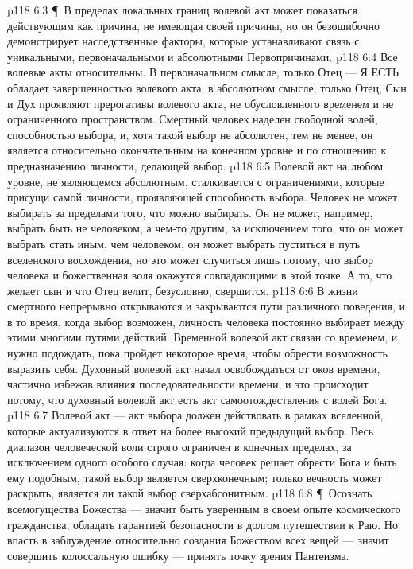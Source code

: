 \vs p118 6:3 \P\ В пределах локальных границ волевой акт может показаться действующим как причина, не имеющая своей причины, но он безошибочно демонстрирует наследственные факторы, которые устанавливают связь с уникальными, первоначальными и абсолютными Первопричинами.
\vs p118 6:4 Все волевые акты относительны. В первоначальном смысле, только Отец --- Я ЕСТЬ обладает завершенностью волевого акта; в абсолютном смысле, только Отец, Сын и Дух проявляют прерогативы волевого акта, не обусловленного временем и не ограниченного пространством. Смертный человек наделен свободной волей, способностью выбора, и, хотя такой выбор не абсолютен, тем не менее, он является относительно окончательным на конечном уровне и по отношению к предназначению личности, делающей выбор.
\vs p118 6:5 Волевой акт на любом уровне, не являющемся абсолютным, сталкивается с ограничениями, которые присущи самой личности, проявляющей способность выбора. Человек не может выбирать за пределами того, что можно выбирать. Он не может, например, выбрать быть не человеком, а чем\hyp{}то другим, за исключением того, что он может выбрать стать иным, чем человеком; он может выбрать пуститься в путь вселенского восхождения, но это может случиться лишь потому, что выбор человека и божественная воля окажутся совпадающими в этой точке. А то, что желает сын и что Отец велит, безусловно, свершится.
\vs p118 6:6 В жизни смертного непрерывно открываются и закрываются пути различного поведения, и в то время, когда выбор возможен, личность человека постоянно выбирает между этими многими путями действий. Временной волевой акт связан со временем, и нужно подождать, пока пройдет некоторое время, чтобы обрести возможность выразить себя. Духовный волевой акт начал освобождаться от оков времени, частично избежав влияния последовательности времени, и это происходит потому, что духовный волевой акт есть акт самоотождествления с волей Бога.
\vs p118 6:7 Волевой акт --- акт выбора должен действовать в рамках вселенной, которые актуализуются в ответ на более высокий предыдущий выбор. Весь диапазон человеческой воли строго ограничен в конечных пределах, за исключением одного особого случая: когда человек решает обрести Бога и быть ему подобным, такой выбор является сверхконечным; только вечность может раскрыть, является ли такой выбор сверхабсонитным.
\vs p118 6:8 \P\ Осознать всемогущества Божества --- значит быть уверенным в своем опыте космического гражданства, обладать гарантией безопасности в долгом путешествии к Раю. Но впасть в заблуждение относительно создания Божеством всех вещей --- значит совершить колоссальную ошибку --- принять точку зрения Пантеизма.
